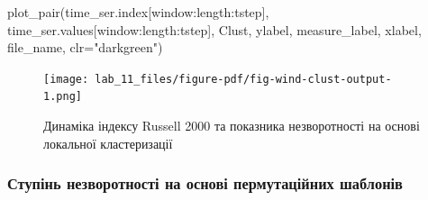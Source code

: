 \documentclass[
  letterpaper,
]{report}
\newenvironment{Shaded}{\begin{snugshade}}{\end{snugshade}}
\newcommand{\CharTok}[1]{\textcolor[rgb]{0.13,0.47,0.30}{#1}}
\newcommand{\NormalTok}[1]{\textcolor[rgb]{0.00,0.23,0.31}{#1}}
\newcommand{\OperatorTok}[1]{\textcolor[rgb]{0.37,0.37,0.37}{#1}}
\newcommand{\SpecialCharTok}[1]{\textcolor[rgb]{0.37,0.37,0.37}{#1}}
\newcommand{\SpecialStringTok}[1]{\textcolor[rgb]{0.13,0.47,0.30}{#1}}
\newcommand{\StringTok}[1]{\textcolor[rgb]{0.13,0.47,0.30}{#1}}
\newcommand{\VerbatimStringTok}[1]{\textcolor[rgb]{0.13,0.47,0.30}{#1}}
\begin{document}
\begin{Shaded}
\begin{Highlighting}[]
\NormalTok{plot\_pair(time\_ser.index[window:length:tstep],}
\NormalTok{          time\_ser.values[window:length:tstep],}
\NormalTok{          Clust, }
\NormalTok{          ylabel, }
\NormalTok{          measure\_label,}
\NormalTok{          xlabel,}
\NormalTok{          file\_name, }
\NormalTok{          clr}\OperatorTok{=}\StringTok{"darkgreen"}\NormalTok{)}
\end{Highlighting}
\end{Shaded}

\begin{figure}[H]

{\centering \texttt{[image: lab\_11\_files/figure-pdf/fig-wind-clust-output-1.png]}

}

\caption{\label{fig-wind-clust}Динаміка індексу Russell 2000 та
показника незворотності на основі локальної кластеризації}

\end{figure}

\hypertarget{ux441ux442ux443ux43fux456ux43dux44c-ux43dux435ux437ux432ux43eux440ux43eux442ux43dux43eux441ux442ux456-ux43dux430-ux43eux441ux43dux43eux432ux456-ux43fux435ux440ux43cux443ux442ux430ux446ux456ux439ux43dux438ux445-ux448ux430ux431ux43bux43eux43dux456ux432}{%
\subsubsection{Ступінь незворотності на основі пермутаційних
шаблонів}\label{ux441ux442ux443ux43fux456ux43dux44c-ux43dux435ux437ux432ux43eux440ux43eux442ux43dux43eux441ux442ux456-ux43dux430-ux43eux441ux43dux43eux432ux456-ux43fux435ux440ux43cux443ux442ux430ux446ux456ux439ux43dux438ux445-ux448ux430ux431ux43bux43eux43dux456ux432}}

\begin{Shaded}
\end{Shaded}
\end{document}
